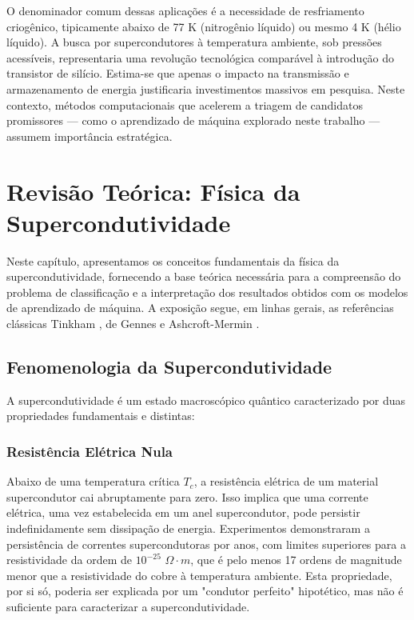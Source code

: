 \documentclass[12pt, a4paper, oneside]{report}
\begin{document}
O denominador comum dessas aplicações é a necessidade de resfriamento criogênico, tipicamente abaixo de 77 K (nitrogênio líquido) ou mesmo 4 K (hélio líquido). A busca por supercondutores à temperatura ambiente, sob pressões acessíveis, representaria uma revolução tecnológica comparável à introdução do transistor de silício. Estima-se que apenas o impacto na transmissão e armazenamento de energia justificaria investimentos massivos em pesquisa. Neste contexto, métodos computacionais que acelerem a triagem de candidatos promissores --- como o aprendizado de máquina explorado neste trabalho --- assumem importância estratégica.

\chapter{Revisão Teórica: Física da Supercondutividade}
\label{chap:fisica}

Neste capítulo, apresentamos os conceitos fundamentais da física da supercondutividade, fornecendo a base teórica necessária para a compreensão do problema de classificação e a interpretação dos resultados obtidos com os modelos de aprendizado de máquina. A exposição segue, em linhas gerais, as referências clássicas Tinkham \cite{tinkham1996}, de Gennes \cite{degennes1966} e Ashcroft-Mermin \cite{ashcroft1976}.

\section{Fenomenologia da Supercondutividade}

A supercondutividade é um estado macroscópico quântico caracterizado por duas propriedades fundamentais e distintas:

\subsection{Resistência Elétrica Nula}

Abaixo de uma temperatura crítica $T_c$, a resistência elétrica de um material supercondutor cai abruptamente para zero. Isso implica que uma corrente elétrica, uma vez estabelecida em um anel supercondutor, pode persistir indefinidamente sem dissipação de energia. Experimentos demonstraram a persistência de correntes supercondutoras por anos, com limites superiores para a resistividade da ordem de $10^{-25}$ $\Omega \cdot m$, que é pelo menos 17 ordens de magnitude menor que a resistividade do cobre à temperatura ambiente. Esta propriedade, por si só, poderia ser explicada por um "condutor perfeito" hipotético, mas não é suficiente para caracterizar a supercondutividade.
\end{document}
